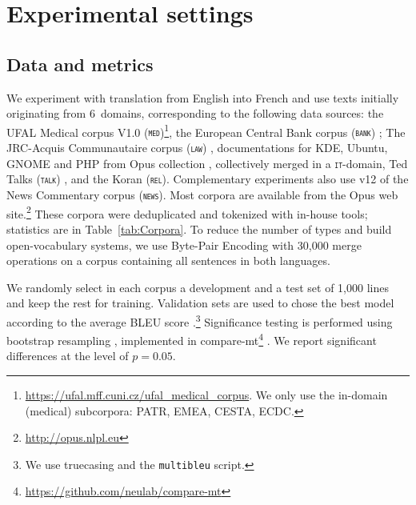 \documentclass[11pt,a4paper]{article}
\newcommand{\fyTodo}[1]{\Todo[FY:]{\textcolor{orange}{#1}}}
\newcommand{\fyDone}[1]{\done[FY]\Todo[FY:]{\textcolor{orange}{#1}}}
\newcommand{\revision}[1]{#1}
\newcommand{\domain}[1]{\texttt{\textsc{#1}}}
\newcommand{\system}[1]{\texttt{{#1}}}
\begin{document}
\fyTodo{Explain lr, may be more}

\section{Experimental settings} \label{sec:exp}
\subsection{Data and metrics \label{ssec:corpora}}
We experiment with translation from English into French and use texts initially originating from 6~domains, corresponding to the following data sources: the UFAL Medical corpus V1.0 (\domain{med})\footnote{\url{https://ufal.mff.cuni.cz/ufal_medical_corpus}. \revision{We only use the in-domain (medical) subcorpora: PATR, EMEA, CESTA, ECDC.}}, the European Central Bank corpus (\domain{bank}) \cite{Tiedemann12parallel}; The JRC-Acquis Communautaire corpus (\domain{law}) \cite{Steinberger06acquis}, documentations for KDE, Ubuntu, GNOME and PHP from Opus collection \cite{Tiedemann09news}, collectively merged in a \domain{it}-domain, Ted Talks (\domain{talk}) \cite{Cettolo12wit}, and the Koran (\domain{rel}). Complementary experiments also use v12 of the News Commentary corpus (\domain{news}). Most corpora are available from the Opus web site.\footnote{\url{http://opus.nlpl.eu}} These corpora were deduplicated and tokenized with in-house tools; statistics are in Table~\ref{tab:Corpora}. To reduce the number of types and build open-vocabulary systems, we use Byte-Pair Encoding \cite{Sennrich16BPE} with 30,000 merge operations on a corpus containing all sentences in both languages.\fyDone{Add \# number of tokens, also specificity ?}%

We randomly select in each corpus a development and a test set of 1,000 lines and keep the rest for training. Validation sets are used to chose the best model according to the average BLEU score \cite{Papineni02bleu}.\footnote{We use truecasing and the \texttt{multibleu} script.}\fyDone{A word about meta-parameter settings} Significance testing is performed using bootstrap resampling \cite{Koehn04statistical}, implemented in compare-mt\footnote{\url{https://github.com/neulab/compare-mt}} \cite{Neubig19compare-mt}. We report significant differences at the level of $p=0.05$.\fyDone{Fix correct p value}
\end{document}
